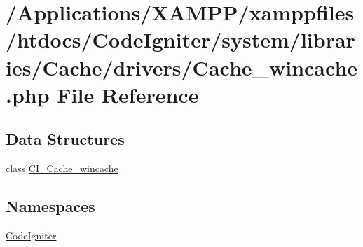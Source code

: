 \hypertarget{_cache__wincache_8php}{}\section{/\+Applications/\+X\+A\+M\+P\+P/xamppfiles/htdocs/\+Code\+Igniter/system/libraries/\+Cache/drivers/\+Cache\+\_\+wincache.php File Reference}
\label{_cache__wincache_8php}
\subsection*{Data Structures}
\begin{DoxyCompactItemize}
\item 
class \mbox{\hyperlink{class_c_i___cache__wincache}{C\+I\+\_\+\+Cache\+\_\+wincache}}
\end{DoxyCompactItemize}
\subsection*{Namespaces}
\begin{DoxyCompactItemize}
\item 
 \mbox{\hyperlink{namespace_code_igniter}{Code\+Igniter}}
\end{DoxyCompactItemize}
